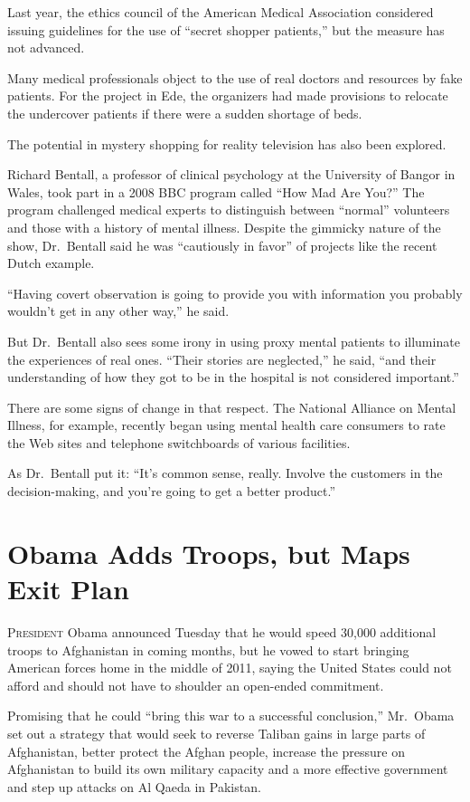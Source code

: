﻿\documentclass[12pt]{article}
\begin{document}
Last year, the ethics council of the American Medical Association considered issuing guidelines for
the use of ``secret shopper patients,'' but the measure has not advanced.

Many medical professionals object to the use of real doctors and resources by fake patients. For the
project in Ede, the organizers had made provisions to relocate the undercover patients if there were
a sudden shortage of beds.

The potential in mystery shopping for reality television has also been explored.

Richard Bentall, a professor of clinical psychology at the University of Bangor in Wales, took part
in a 2008 BBC program called ``How Mad Are You?'' The program challenged medical experts to
distinguish between ``normal'' volunteers and those with a history of mental illness. Despite the
gimmicky nature of the show, Dr.~Bentall said he was ``cautiously in favor'' of projects like the
recent Dutch example.

``Having covert observation is going to provide you with information you probably wouldn't get in
any other way,'' he said.

But Dr.~Bentall also sees some irony in using proxy mental patients to illuminate the experiences of
real ones. ``Their stories are neglected,'' he said, ``and their understanding of how they got to be
in the hospital is not considered important.''

There are some signs of change in that respect. The National Alliance on Mental Illness, for
example, recently began using mental health care consumers to rate the Web sites and telephone
switchboards of various facilities.

As Dr.~Bentall put it: ``It's common sense, really. Involve the customers in the decision-making,
and you're going to get a better product.''

\section{Obama Adds Troops, but Maps Exit Plan}

\lettrine{P}{resident} Obama announced Tuesday that he would speed 30,000
additional troops to Afghanistan in coming months, but he vowed to start bringing American forces
home in the middle of 2011, saying the United States could not afford and should not have to
shoulder an open-ended commitment.

Promising that he could ``bring this war to a successful conclusion,'' Mr.~Obama set out a strategy
that would seek to reverse Taliban gains in large parts of Afghanistan, better protect the Afghan
people, increase the pressure on Afghanistan to build its own military capacity and a more effective
government and step up attacks on Al Qaeda in Pakistan.
\end{document}
